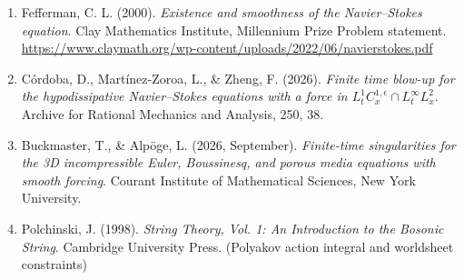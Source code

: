 \documentclass[12pt,a4paper]{article}
\begin{document}
\begin{enumerate}
    \item Fefferman, C. L. (2000). \textit{Existence and smoothness of the Navier--Stokes equation}. Clay Mathematics Institute, Millennium Prize Problem statement. \url{https://www.claymath.org/wp-content/uploads/2022/06/navierstokes.pdf}
    \item Córdoba, D., Martínez-Zoroa, L., \& Zheng, F. (2026). \textit{Finite time blow-up for the hypodissipative Navier--Stokes equations with a force in $L_t^1 C_x^{1,\epsilon} \cap L_t^\infty L_x^2$}. Archive for Rational Mechanics and Analysis, 250, 38.
    \item Buckmaster, T., \& Alpöge, L. (2026, September). \textit{Finite-time singularities for the 3D incompressible Euler, Boussinesq, and porous media equations with smooth forcing}. Courant Institute of Mathematical Sciences, New York University.
    \item Polchinski, J. (1998). \textit{String Theory, Vol. 1: An Introduction to the Bosonic String}. Cambridge University Press. (Polyakov action integral and worldsheet constraints)
\end{enumerate}
\end{document}
